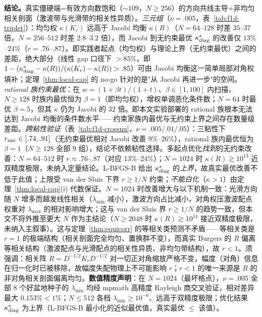 \documentclass[fontset=windows,11pt]{ctexart}
\numberwithin{equation}{section}
\begin{document}
\noindent\textbf{结论。}真实僵硬端=有效方向数饱和（$\sim109$，$N\ge256$）的方向共线主导+非均匀相关剖面（激波带与光滑带的相关性异质）。\emph{三元组}（$\nu=.005$，表~\ref{tab:f1d-triplet}）：均匀权 $\kappa(K_r)$ 远高于 Jacobi 均衡 $\kappa(R)$（$N=64$--$128$ 时差 $35$--$37$ 倍，$N=256$--$512$ 时差 $2.8$--$3.2$ 倍），而 Jacobi 到无约束最优 $\kappa^*_{\rm diag}$ 的改善仅 $13\%$--$24\%$（$r=.76$--$.87$）。即实践者起点（均匀权）与理论上界（无约束最优）之间的差距，绝大部分（线性 gap 口径下 $>85\%$，即 $1-(\kappa^*_{\rm diag}-\kappa(R))/(\kappa(K_r)-\kappa(R))>.85$）可由 Jacobi 均衡这一简单局部对角权填补；定理~\ref{thm:local-cap} 的 no-go 针对的是"从 Jacobi 再进一步"的空间。\emph{rational 族约束最优}：在 $w=(1+\beta t)/(1+t)$、$\beta\in[1,100]$ 内扫描，$N\ge128$ 时族内最优恒为 $\beta=1$（即均匀权），增权单调恶化条件数；$N=64$ 时最优 $\beta=5$，但其 $\kappa$ 仍为 Jacobi 的 $32$ 倍。即本文实验部署的 rational 族根本无法达到 Jacobi 均衡的条件数水平——约束家族内最优与无约束上界之间存在数量级差距。\emph{跨粘性验证}（表~\ref{tab:f1d-crossnu}，$\nu=.005/.01/.05$）：三粘性下 $r_{\rm unc}\in[.74,.91]$（无约束最优相对 Jacobi 改善 9\%--26\%），rational 族内最优恒为 $\beta=1$（$N\ge128$ 全部 9 组），结论不依赖粘性选择。多起点优化\emph{找到}的无约束改善：$N=64$--$512$ 时 $r\approx.76$--$.87$（对应 13\%--24\%）；$N=1024$ 时 $\kappa(R)\gtrsim10^{13}$ 近双精度极限，未纳入定量结论。L-BFGS-B 给出 $\kappa^*_{\rm diag}$ 的\emph{上界}，故真实最优改善不低于此值；上限受 van der Sluis 下界 $r\ge1/N$ 约束；\emph{不能白化}（$\kappa>1$）由定理~\ref{thm:local-cap}(i) 代数保证。$N=1024$ 时改善增大与以下机制一致：光滑方向随 $N$ 增多而越发线性相关（$\lambda_{\min}$ 减小），激波方向占比减小，对角权压激波配点权重对 $\lambda_{\max}$ 的相对影响增大；这与 van der Sluis 界 $r\ge1/N$ 的趋势一致，但本文不将外推至更大 $N$ 作为主结论（$N\ge2048$ 时 $\kappa(R)\gtrsim10^{14}$ 接近双精度极限，未纳入主叙事）。这与定理~\ref{thm:equicorr} 的等相关类预测不矛盾——等相关类是 $r=1$ 的极端结构（相关剖面完全均匀、置换群不变），而真实 Burgers 的 $R$ 偏离等相关结构（激波配点与光滑配点的相关性异质、非均匀带结构），故 $r<1$。须强调：相关阵 $R=D^{-1/2}K_rD^{-1/2}$ 对一切正对角缩放严格不变，幅度（对角）信息在归一化时已被移除，故幅度失配物理上不可能影响 $r$；$r<1$ 的唯一来源是 $R$ 的非对角相关剖面偏离均匀。\textbf{数值精度声明}：在 $N=1024$（最坏格点），$\nu=.005$ 全部 8 个好盆地种子的 $\lambda_{\min}$ 均经 mpmath 高精度 Rayleigh 商交叉验证，相对差异最大 $0.153\%<1\%$；$N\le512$ 各档 $\lambda_{\min}\ge10^{-6}$、远高于双精度极限；优化结果 $\kappa^*_{\rm diag}$ 为上界（L-BFGS-B 最小化的近似最优值，真实最优 $\le$ 该值）。
\end{document}
